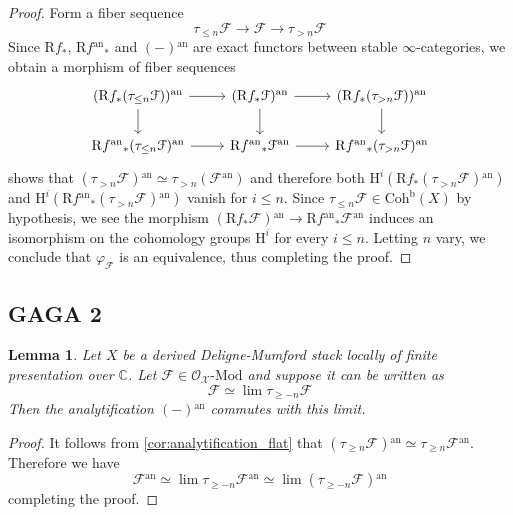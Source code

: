 \documentclass[12pt,a4paper,reqno]{amsart}
\theoremstyle{plain}
\newtheorem{lem}[thm]{Lemma}
\theoremstyle{definition}
\theoremstyle{remark}
\numberwithin{equation}{section}
\begin{document}
\begin{proof}
	Form a fiber sequence
	\[ \tau_{\le n} {\mathcal F} \to {\mathcal F} \to \tau_{> n} {\mathcal F} \]
	Since ${\mathrm R} f_*$, ${\mathrm R} f{^\mathrm{an}}_*$ and $(-){^\mathrm{an}}$ are exact functors between stable $\infty$-categories, we obtain a morphism of fiber sequences
	\[ \begin{tikzcd}
		({\mathrm R} f_*(\tau_{\le n} {\mathcal F})){^\mathrm{an}} \arrow{r} \arrow{d} & ({\mathrm R} f_* {\mathcal F}){^\mathrm{an}} \arrow{r} \arrow{d} & ({\mathrm R} f_* (\tau_{> n} {\mathcal F})){^\mathrm{an}} \arrow{d} \\
		{\mathrm R} f{^\mathrm{an}}_* (\tau_{\le n} {\mathcal F}){^\mathrm{an}} \arrow{r} & {\mathrm R} f{^\mathrm{an}}_* {\mathcal F}{^\mathrm{an}} \arrow{r} & {\mathrm R} f{^\mathrm{an}}_* (\tau_{> n} {\mathcal F}){^\mathrm{an}}
	\end{tikzcd} \]
	 shows that $(\tau_{>n} {\mathcal F}){^\mathrm{an}} \simeq \tau_{> n}({\mathcal F} {^\mathrm{an}})$ and therefore both ${\mathrm H}^i({\mathrm R} f_* (\tau_{>n} {\mathcal F}){^\mathrm{an}})$ and ${\mathrm H}^i({\mathrm R} f{^\mathrm{an}}_*(\tau_{>n} {\mathcal F}){^\mathrm{an}})$ vanish for $i \le n$.
	Since $\tau_{\le n} {\mathcal F} \in {\mathrm{Coh}^{\mathrm{b}}}(X)$ by hypothesis, we see the morphism $({\mathrm R} f_* {\mathcal F}){^\mathrm{an}} \to {\mathrm R} f{^\mathrm{an}}_* {\mathcal F}{^\mathrm{an}}$ induces an isomorphism on the cohomology groups ${\mathrm H}^i$ for every $i \le n$.
	Letting $n$ vary, we conclude that $\varphi_{\mathcal F}$ is an equivalence, thus completing the proof.
\end{proof}

\subsection{GAGA 2}

\begin{lem} \label{lem:analytification_inverse_limits}
	Let $X$ be a derived {Deligne-Mumford\xspace} stack locally of finite presentation over $\mathbb C$.
	Let ${\mathcal F} \in {\mathcal O}_{\mathcal X} \textrm{-} {\mathrm{Mod}}$ and suppose it can be written as
	\[ {\mathcal F} \simeq \lim \tau_{\ge -n} {\mathcal F} \]
	Then the analytification $(-){^\mathrm{an}}$ commutes with this limit.
\end{lem}

\begin{proof}
	It follows from \cref{cor:analytification_flat} that $(\tau_{\ge n} {\mathcal F}){^\mathrm{an}} \simeq \tau_{\ge n} {\mathcal F}{^\mathrm{an}}$.
	Therefore we have
	\[ {\mathcal F}{^\mathrm{an}} \simeq \lim \tau_{\ge -n} {\mathcal F}{^\mathrm{an}} \simeq \lim (\tau_{\ge -n} {\mathcal F}){^\mathrm{an}} \]
	completing the proof.
\end{proof}
\end{document}
